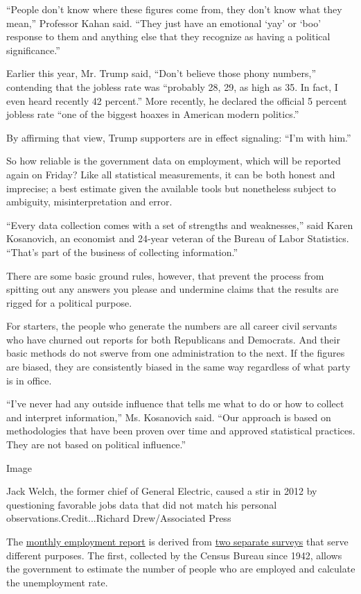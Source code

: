 ``People don't know where these figures come from, they don't know what
they mean,'' Professor Kahan said. ``They just have an emotional `yay'
or `boo' response to them and anything else that they recognize as
having a political significance.''

Earlier this year, Mr. Trump said, ``Don't believe those phony
numbers,'' contending that the jobless rate was ``probably 28, 29, as
high as 35. In fact, I even heard recently 42 percent.'' More recently,
he declared the official 5 percent jobless rate ``one of the biggest
hoaxes in American modern politics.''

By affirming that view, Trump supporters are in effect signaling: ``I'm
with him.''

So how reliable is the government data on employment, which will be
reported again on Friday? Like all statistical measurements, it can be
both honest and imprecise; a best estimate given the available tools but
nonetheless subject to ambiguity, misinterpretation and error.

``Every data collection comes with a set of strengths and weaknesses,''
said Karen Kosanovich, an economist and 24-year veteran of the Bureau of
Labor Statistics. ``That's part of the business of collecting
information.''

There are some basic ground rules, however, that prevent the process
from spitting out any answers you please and undermine claims that the
results are rigged for a political purpose.

For starters, the people who generate the numbers are all career civil
servants who have churned out reports for both Republicans and
Democrats. And their basic methods do not swerve from one administration
to the next. If the figures are biased, they are consistently biased in
the same way regardless of what party is in office.

``I've never had any outside influence that tells me what to do or how
to collect and interpret information,'' Ms. Kosanovich said. ``Our
approach is based on methodologies that have been proven over time and
approved statistical practices. They are not based on political
influence.''

Image

Jack Welch, the former chief of General Electric, caused a stir in 2012
by questioning favorable jobs data that did not match his personal
observations.Credit...Richard Drew/Associated Press

The \href{http://www.bls.gov/cps/cps_htgm.pdf}{monthly employment
report} is derived from
\href{http://www.bls.gov/cps/documentation.htm}{two separate surveys}
that serve different purposes. The first, collected by the Census Bureau
since 1942, allows the government to estimate the number of people who
are employed and calculate the unemployment rate.

